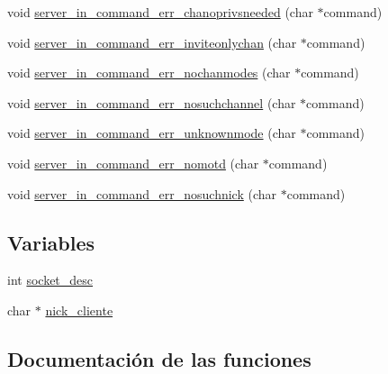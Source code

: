 \begin{DoxyCompactItemize}
\item 
void \hyperlink{G-2313-06-P2__client__err__handlers_8c_a9fcb3f66fbcc994c7a78b36ebc0fe63d}{server\+\_\+in\+\_\+command\+\_\+err\+\_\+chanoprivsneeded} (char $\ast$command)
\item 
void \hyperlink{G-2313-06-P2__client__err__handlers_8c_ae5512c3dd8e1584fd8bafc4f5dd15d8c}{server\+\_\+in\+\_\+command\+\_\+err\+\_\+inviteonlychan} (char $\ast$command)
\item 
void \hyperlink{G-2313-06-P2__client__err__handlers_8c_aade31864807344a9961ffdab697b5727}{server\+\_\+in\+\_\+command\+\_\+err\+\_\+nochanmodes} (char $\ast$command)
\item 
void \hyperlink{G-2313-06-P2__client__err__handlers_8c_a83109e15e2a8f93c9523a84a546098c0}{server\+\_\+in\+\_\+command\+\_\+err\+\_\+nosuchchannel} (char $\ast$command)
\item 
void \hyperlink{G-2313-06-P2__client__err__handlers_8c_af262f3569e06c21e3e466266fa4e2c80}{server\+\_\+in\+\_\+command\+\_\+err\+\_\+unknownmode} (char $\ast$command)
\item 
void \hyperlink{G-2313-06-P2__client__err__handlers_8c_a678f368edc1fd437f5f115ef897bdcd9}{server\+\_\+in\+\_\+command\+\_\+err\+\_\+nomotd} (char $\ast$command)
\item 
void \hyperlink{G-2313-06-P2__client__err__handlers_8c_a01f8c9822aac18d5424ebbaf67c06a51}{server\+\_\+in\+\_\+command\+\_\+err\+\_\+nosuchnick} (char $\ast$command)
\end{DoxyCompactItemize}
\subsection*{Variables}
\begin{DoxyCompactItemize}
\item 
int \hyperlink{G-2313-06-P2__client__err__handlers_8c_adeadf7cb6916a10c7142ce7d265ab32a}{socket\+\_\+desc}
\item 
char $\ast$ \hyperlink{G-2313-06-P2__client__err__handlers_8c_ab93a317ee9a27c82844c9128a76b136a}{nick\+\_\+cliente}
\end{DoxyCompactItemize}


\subsection{Documentación de las funciones}
